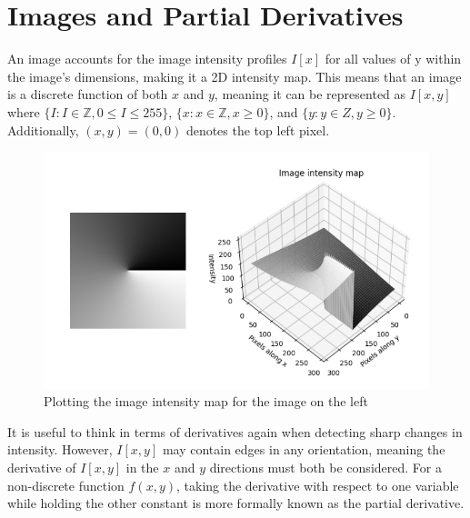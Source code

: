 \documentclass{article}
\begin{document}
\section{Images and Partial Derivatives}
\setcounter{equation}{0}
An image accounts for the image intensity profiles $I[x]$ for all values of y within the image's dimensions, making it a 2D intensity map. This means that an image is a discrete function of both $x$ and $y$, meaning it can be represented as $I[x,y]$ where $\{I:I \in \mathbb{Z}, 0 \le I \le 255\}$, $\{x:x \in \mathbb{Z}, x \ge 0\}$, and $\{y:y \in Z, y \ge 0\}$. Additionally, $(x,y)=(0,0)$ denotes the top left pixel.

\begin{figure}[!hbtp]
    \centering
    \includegraphics[width=\textwidth]{figures/figure05.png}
    \caption{Plotting the image intensity map for the image on the left}
    \label{fig:figure 5}
\end{figure}

It is useful to think in terms of derivatives again when detecting sharp changes in intensity. However, $I[x,y]$ may contain edges in any orientation, meaning the derivative of $I[x,y]$ in the $x$ and $y$ directions must both be considered. For a non-discrete function $f(x,y)$, taking the derivative with respect to one variable while holding the other constant is more formally known as the partial derivative.
\end{document}
